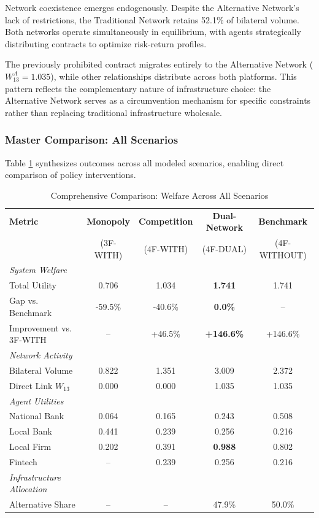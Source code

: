\documentclass[12pt]{article}
\begin{document}
Network coexistence emerges endogenously. Despite the Alternative Network's lack of restrictions, the Traditional Network retains 52.1\% of bilateral volume. Both networks operate simultaneously in equilibrium, with agents strategically distributing contracts to optimize risk-return profiles.

The previously prohibited contract migrates entirely to the Alternative Network ($W^A_{13} = 1.035$), while other relationships distribute across both platforms. This pattern reflects the complementary nature of infrastructure choice: the Alternative Network serves as a circumvention mechanism for specific constraints rather than replacing traditional infrastructure wholesale.

\subsubsection{Master Comparison: All Scenarios}

Table \ref{tab:master_comparison} synthesizes outcomes across all modeled scenarios, enabling direct comparison of policy interventions.

\begin{table}[h]
\centering
\caption{Comprehensive Comparison: Welfare Across All Scenarios}
\label{tab:master_comparison}
\begin{tabular}{lcccc}
\toprule
\textbf{Metric} & \textbf{Monopoly} & \textbf{Competition} & \textbf{Dual-Network} & \textbf{Benchmark} \\
 & (3F-WITH) & (4F-WITH) & (4F-DUAL) & (4F-WITHOUT) \\
\midrule
\textit{System Welfare} & & & & \\
\quad Total Utility & 0.706 & 1.034 & \textbf{1.741} & 1.741 \\
\quad Gap vs. Benchmark & -59.5\% & -40.6\% & \textbf{0.0\%} & -- \\
\quad Improvement vs. 3F-WITH & -- & +46.5\% & \textbf{+146.6\%} & +146.6\% \\
\midrule
\textit{Network Activity} & & & & \\
\quad Bilateral Volume & 0.822 & 1.351 & 3.009 & 2.372 \\
\quad Direct Link $W_{13}$ & 0.000 & 0.000 & 1.035 & 1.035 \\
\midrule
\textit{Agent Utilities} & & & & \\
\quad National Bank & 0.064 & 0.165 & 0.243 & 0.508 \\
\quad Local Bank & 0.441 & 0.239 & 0.256 & 0.216 \\
\quad Local Firm & 0.202 & 0.391 & \textbf{0.988} & 0.802 \\
\quad Fintech & -- & 0.239 & 0.256 & 0.216 \\
\midrule
\textit{Infrastructure Allocation} & & & & \\
\quad Alternative Share & -- & -- & 47.9\% & 50.0\% \\
\bottomrule
\end{tabular}
\end{table}
\end{document}
